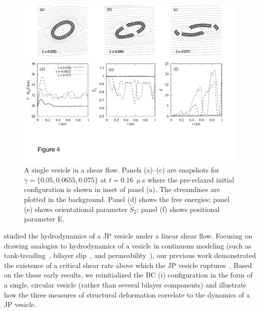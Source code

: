 \documentclass[prb,preprint,showpacs,preprintnumbers,amsmath,amssymb,longbibliography]{revtex4-1}
\begin{document}
\begin{figure}
  \begin{center}
    \includegraphics[width=1.0\textwidth]{Figures/Figure4.pdf}
  \end{center}
  \caption{
    \label{fig:Ves_shear}
A single vesicle in a shear flow. Panels (a)--(c) are snapshots for
  $\dot \gamma = \{0.05, 0.0655, 0.075\}$ at $t=0.16\ \upmu$s where the
  pre-relaxed initial configuration is shown in inset of panel (a). The
  streamlines are plotted in the background. Panel (d) shows the free
  energies; panel (e) shows orientational parameter $\tilde{S}_2$; panel
  (f) shows positional parameter E.}
\end{figure}
\citet{Fu2022_JFM} studied the hydrodynamics of a JP vesicle under a
linear shear flow. Focusing on drawing analogies to hydrodynamics of a
vesicle in continuum modeling (such as
tank-treading~\cite{keller_skalak_1982,Finken08,Shaqfeh11}, bilayer
slip~\cite{sch-vla-mik2010,denOtter2007,Zgorski2019}, and
permeability~\cite{chabanon2017, qua-gan-you2021}), our previous work
demonstrated the existence of a critical shear rate above which the JP vesicle
ruptures~\cite{grandmaison_brancherie_salsac_2021,D2SM00179A}. Based on
the these early results, we reinitialized the BC (i) configuration in
the form of a single, circular vesicle (rather than several bilayer
components) and illustrate how the three measures of structural
deformation correlate to the dynamics of a JP vesicle.
\end{document}
